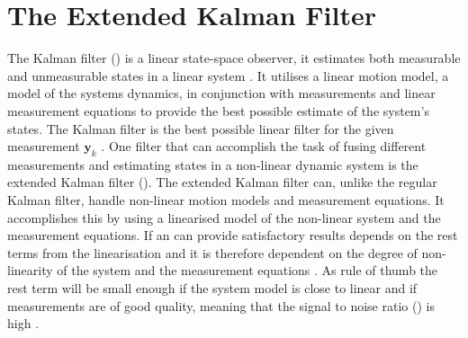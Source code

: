 \section{The Extended Kalman Filter}
The Kalman filter (\abbrKF) is a linear state-space observer, it estimates both measurable and unmeasurable states in a linear system \citep{sensorfusion}. It utilises a linear motion model, a model of the systems dynamics, in conjunction with measurements and linear measurement equations to provide the best possible estimate of the system's states. The Kalman filter is the best possible linear filter for the given measurement $\boldsymbol{y}_{k}$ \citep{sensorfusion}. One filter that can accomplish the task of fusing different measurements and estimating states in a non-linear dynamic system is the extended Kalman filter (\abbrEKF). The extended Kalman filter can, unlike the regular Kalman filter, handle non-linear motion models and measurement equations. It accomplishes this by using a linearised model of the non-linear system and the measurement equations. If an \abbrEKF can provide satisfactory results depends on the rest terms from the linearisation and it is therefore dependent on the degree of non-linearity of the system and the measurement equations \citep{sensorfusion}. As rule of thumb the rest term will be small enough if the system model is close to linear and if measurements are of good quality, meaning that the signal to noise ratio (\abbrSNR) is high \citep{sensorfusion}. 

